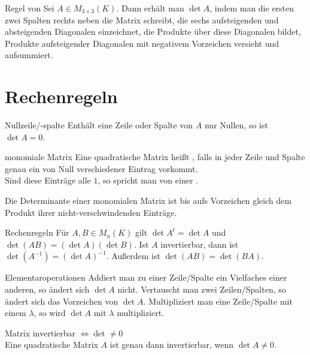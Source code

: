\begin{Satz}{Regel von }
    Sei $A \in M_{3 \times 3}(K)$.
    Dann erhält man $\det A$, indem man die ersten zwei Spalten rechts neben
    die Matrix schreibt, die sechs aufsteigenden und absteigenden Diagonalen
    einzeichnet, die Produkte über diese Diagonalen bildet, Produkte
    aufsteigender Diagonalen mit negativem Vorzeichen versieht und aufsummiert.
\end{Satz}

\section{%
    Rechenregeln%
}

\begin{Lemma}{Nullzeile/-spalte}
    Enthält eine Zeile oder Spalte von $A$ nur Nullen, so ist $\det A = 0$.
\end{Lemma}

\begin{Def}{monomiale Matrix}
    Eine quadratische Matrix heißt , falls in jeder Zeile und
    Spalte genau ein von Null verschiedener Eintrag vorkommt. \\
    Sind diese Einträge alle $1$, so spricht man von einer
    .
\end{Def}

\begin{Kor}
    Die Determinante einer monomialen Matrix ist bis aufs Vorzeichen gleich
    dem Produkt ihrer nicht-verschwindenden Einträge.
\end{Kor}

\begin{Satz}{Rechenregeln}
    Für $A, B \in M_n(K)$ gilt
    $\det A^t = \det A$ und $\det(AB) = (\det A)(\det B)$.
    Ist $A$ invertierbar, dann ist $\det (A^{-1}) = (\det A)^{-1}$.
    \qquad Außerdem ist $\det(AB) = \det(BA)$.
\end{Satz}

\begin{Satz}{Elementaroperationen}
    Addiert man zu einer Zeile/Spalte ein Vielfaches einer anderen, so ändert
    sich $\det A$ nicht.
    Vertauscht man zwei Zeilen/Spalten, so ändert sich das Vorzeichen von
    $\det A$.
    Multipliziert man eine Zeile/Spalte mit einem $\lambda$, so wird $\det A$
    mit $\lambda$ multipliziert.
\end{Satz}

\begin{Satz}{Matrix invertierbar $\Leftrightarrow \det \not= 0$} \\
    Eine quadratische Matrix $A$ ist genau dann invertierbar, wenn
    $\det A \not= 0$.
\end{Satz}

